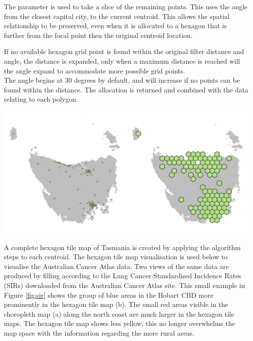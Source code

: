 \documentclass[
]{jss}
\begin{document}
The  parameter is used to take a slice of the remaining
points. This uses the angle from the closest capital city, to the
current centroid. This allows the spatial relationship to be preserved,
even when it is allocated to a hexagon that is further from the focal
point then the original centroid location.

If no available hexagon grid point is found within the original filter
distance and angle, the distance is expanded, only when a maximum
distance is reached will the angle expand to accommodate more possible
grid points.\\
The angle begins at 30 degrees by default, and will increase if no
points can be found within the  distance. The
allocation is returned and combined with the data relating to each
polygon.

\begin{CodeChunk}


\begin{center}\includegraphics[width=1\linewidth]{figures/6allocate} \end{center}

\end{CodeChunk}

A complete hexagon tile map of Tasmania is created by applying the
algorithm steps to each centroid. The hexagon tile map visualisation is
used below to visualise the Australian Cancer Atlas data. Two views of
the same data are produced by filling according to the Lung Cancer
Standardised Incidence Rates (SIRs) downloaded from the Australian
Cancer Atlas site. This small example in Figure \ref{fig:sir} shows the
group of blue areas in the Hobart CBD more prominently in the hexagon
tile map (b). The small red areas visible in the choropleth map (a)
along the north coast are much larger in the hexagon tile maps. The
hexagon tile map shows less yellow, this no longer overwhelms the map
space with the information regarding the more rural areas.
\end{document}
